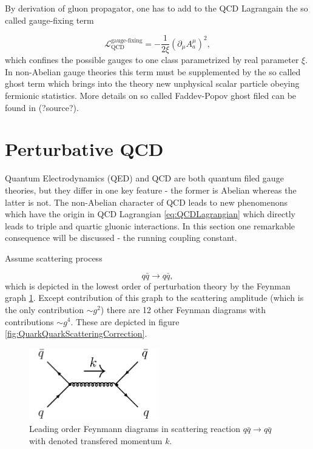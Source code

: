 \documentclass[a4paper,11pt]{report}
\begin{document}
By derivation of gluon propagator, one has to add to the QCD Lagrangain the so
called gauge-fixing term

\begin{equation}
  \mathscr{L}_{\text{QCD}}^{\text{gauge-fixing}} = - \frac{1}{2\xi} \left( \partial_\mu A_a^\mu
  \right)^2,
  \label{eq:QCDGaugeFixingTerm}
\end{equation}
which confines the possible gauges to one class parametrized by real parameter
$\xi$. In non-Abelian gauge theories this term must be supplemented by the so
called ghost term which brings into the theory new unphysical scalar particle
obeying fermionic statistics. More details on so called Faddev-Popov ghost filed
can be found in (?source?).


\section{Perturbative QCD}

Quantum Electrodynamics (QED) and QCD are both quantum filed gauge theories, but
they differ in one key feature - the former is Abelian whereas the latter is
not. The non-Abelian character of QCD leads to new phenomenons which have the origin in QCD
Lagrangian \eqref{eq:QCDLagrangian} which directly leads to triple and quartic
gluonic interactions. In this section one remarkable consequence will be
discussed - the running coupling constant.

Assume scattering process  

\begin{equation}
  q \bar{q} \rightarrow q \bar{q},
  \label{eq:QuarkScattering}
\end{equation}
which is depicted in the lowest order of perturbation theory by the Feynman
graph \ref{fig:QuarkQuarkScattering}. Except contribution of this graph to the
scattering amplitude (which is the only contribution $\sim g^2$) there are 12
other Feynman diagrams with contributions $\sim g^4$. These are depicted in
figure \ref{fig:QuarkQuarkScatteringCorrection}. 

\begin{figure}[t]
  \centering
  \includegraphics[width=0.5\textwidth]{Chapter1/QuarkQuarkScattering.png} 
  \caption{Leading order Feynmann diagrams in scattering reaction $q \bar{q}
    \rightarrow q \bar{q}$ with denoted transfered momentum $k$.}
  \label{fig:QuarkQuarkScattering}
\end{figure}
\end{document}
